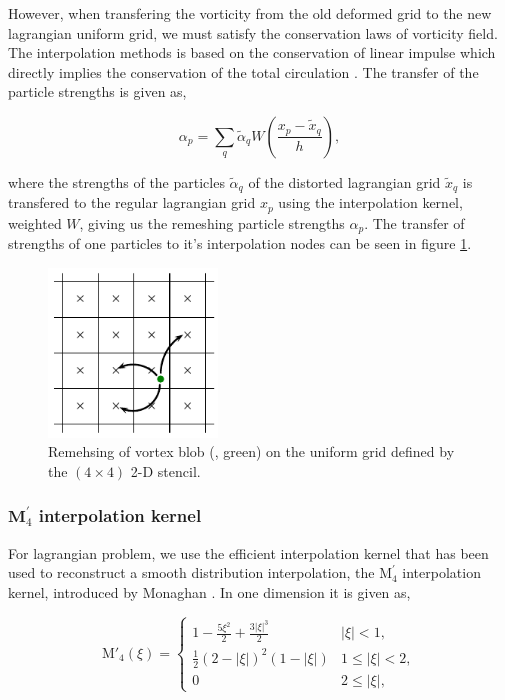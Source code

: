However, when transfering the vorticity from the old deformed grid to the new lagrangian uniform grid, we must satisfy the conservation laws of vorticity field. The interpolation methods is based on the conservation of linear impulse which directly implies the conservation of the total circulation \cite{Cottet2000a}. The transfer of the particle strengths is given as, 

	\begin{equation}
	\alpha_p = \sum_q\tilde{\alpha}_q W \left(\frac{x_p - \tilde{x}_q}{h}\right),	
	\end{equation}

where the strengths of the particles $\tilde{\alpha}_q$ of the distorted lagrangian grid $\tilde{x}_q$ is transfered to the regular lagrangian grid $x_p$ using the interpolation kernel, weighted $W$, giving us the remeshing particle strengths $\alpha_p$. The transfer of strengths of one particles to it's interpolation nodes can be seen in figure \ref{fig:interpolationGrid}.


	\begin{figure}[!b]
	\centering
	\includegraphics[width=0.4\textwidth]{figures/lagrangian/interpolationGrid.pdf}
	\caption{Remehsing of vortex blob ({\color{plotGreen}{$\bullet$}}, green) on the uniform grid defined by the $\left(4\times4\right)$ 2-D stencil.}
	\label{fig:interpolationGrid}
	\end{figure}

\subsubsection*{$\mathbf{M}^\prime_4$ interpolation kernel}
For lagrangian problem, we use the efficient interpolation kernel that has been used to reconstruct a smooth distribution interpolation, the $\mathrm{M}^{\prime}_4$ interpolation kernel, introduced by Monaghan \cite{Monaghan1985}. In one dimension it is given as,

	\begin{equation}
	{\mathrm{M'}_4}\left( {\xi} \right) =
	  \begin{cases}
	   {1 - \frac{{5{\xi ^2}}}{2} + \frac{{3{{\left| \xi  \right|}^3}}}{2}} & {\left| \xi \right|} < 1, \\
	   \frac{1}{2}{\left( {2 - \left| \xi  \right|} \right)^2}\left( {1 - \left| \xi  \right|} \right) & 1 \le {\left| \xi \right|} < 2,\\
	   0 & 2 \le \left| \xi \right|,
	  \end{cases}
	\label{eq:interpKernel}
	\end{equation}

